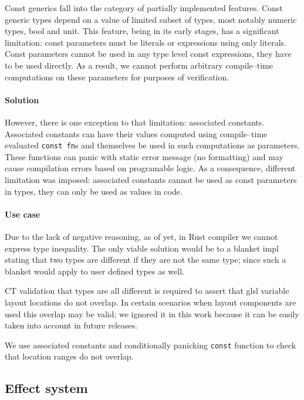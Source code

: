 Const generics fall into the category of partially implemented features. Const generic types depend on a value of limited subset of types, most notably numeric types, bool and unit.
This feature, being in its early stages, has a significant limitation: const parameters must be literals or expressions using only literals. 
Const parameters cannot be used in any type level const expressions, they have to be used directly. 
As a result, we cannot perform arbitrary compile--time computations on these parameters for purposes of verification.

\paragraph{Solution}

However, there is one exception to that limitation: associated constants. Associated constants can have their values computed using compile--time evaluated \texttt{const fn}s and themselves be used in such computations as parameters.
These functions can panic with static error message (no formatting) and may cause compilation errors based on programable logic.
As a consequence, different limitation was imposed: associated constants cannot be used as const parameters in types, they can only be used as values in code.

\paragraph{Use case}

Due to the lack of negative reasoning, as of yet, in Rust compiler we cannot express type inequality.
The only viable solution would be to a blanket impl stating that two types are different if they are not the same type; since such a blanket would apply to user defined types as well.

CT validation that types are all different is required to assert that glsl variable layout locations do not overlap.
In certain scenarios when layout components are used this overlap may be valid; we ignored it in this work because it can be easily taken into account in future releases.

We use associated constants and conditionally panicking \texttt{const} function to check that location ranges do not overlap.

\subsection{Effect system}

